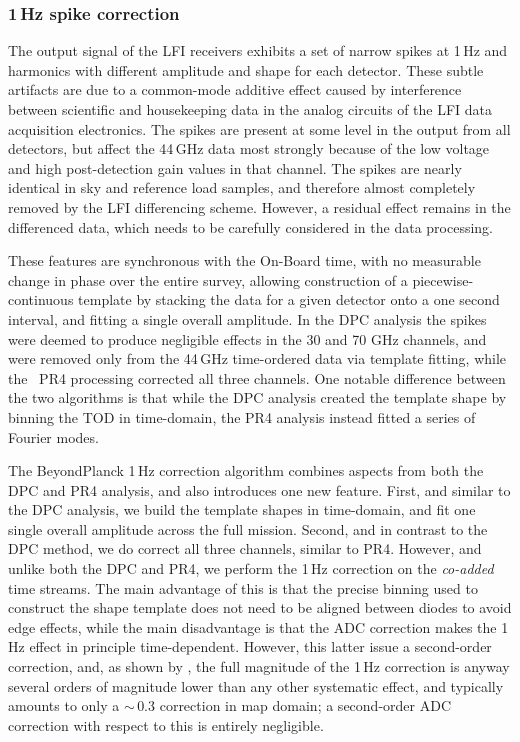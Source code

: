 \documentclass[onecolumn]{aa}
\begin{document}
\subsubsection{1\,Hz spike correction}

The output signal of the LFI receivers exhibits a set of narrow spikes
at 1\,Hz and harmonics with different amplitude and shape for each
detector.  These subtle artifacts are due to a common-mode additive
effect caused by interference between scientific and housekeeping data
in the analog circuits of the LFI data acquisition electronics.  The
spikes are present at some level in the output from all detectors, but
affect the 44\,GHz data most strongly because of the low voltage and
high post-detection gain values in that channel. The spikes are
nearly identical in sky and reference load samples, and therefore 
almost completely removed by the LFI differencing scheme. However, a
residual effect remains in the differenced data, which needs to be
carefully considered in the data processing.

These features are synchronous with the On-Board time, with no
measurable change in phase over the entire survey, allowing
construction of a piecewise-continuous template by stacking the data
for a given detector onto a one second interval, and fitting a single
overall amplitude. In the DPC analysis the spikes were deemed to
produce negligible effects in the 30 and 70 GHz channels, and were
removed only from the 44\,GHz time-ordered data via template fitting,
while the \Planck\ PR4 processing corrected all three channels. One
notable difference between the two algorithms is that while the DPC
analysis created the template shape by binning the TOD in time-domain,
the PR4 analysis instead fitted a series of Fourier modes.

The BeyondPlanck 1\,Hz correction algorithm combines aspects from both
the DPC and PR4 analysis, and also introduces one new feature. First,
and similar to the DPC analysis, we build the template shapes in
time-domain, and fit one single overall amplitude across the full
mission. Second, and in contrast to the DPC method, we do correct all
three channels, similar to PR4. However, and unlike both the DPC and
PR4, we perform the 1\,Hz correction on the \emph{co-added} time
streams. The main advantage of this is that the precise binning used
to construct the shape template does not need to be aligned between
diodes to avoid edge effects, while the main disadvantage is that the
ADC correction makes the 1\,Hz effect in principle
time-dependent. However, this latter issue a second-order correction,
and, as shown by \citet{bp10}, the full magnitude of the 1\,Hz
correction is anyway several orders of magnitude lower than any other
systematic effect, and typically amounts to only a $\sim\,$0.3\muK
correction in map domain; a second-order ADC correction with respect
to this is entirely negligible. 
\end{document}
